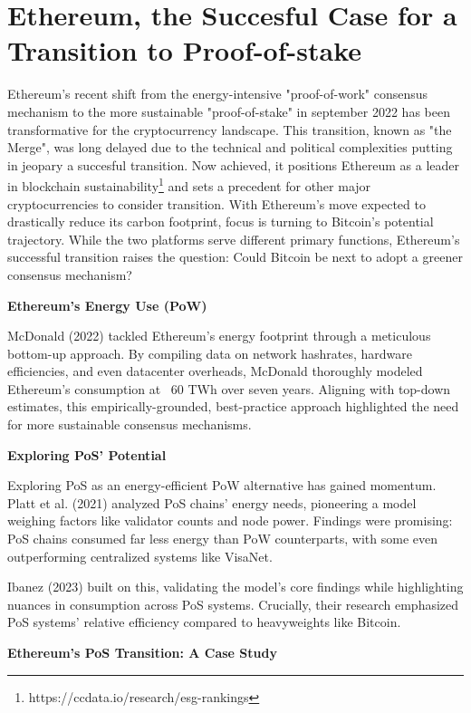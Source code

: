 \documentclass[11pt]{report}
\begin{document}
\section{Ethereum, the Succesful Case for a Transition to Proof-of-stake}

Ethereum's recent shift from the energy-intensive "proof-of-work" consensus mechanism to the more sustainable "proof-of-stake" in september 2022 has been transformative for the cryptocurrency landscape. This transition, known as "the Merge", was long delayed due to the technical and political complexities putting in jeopary a succesful transition. Now achieved, it positions Ethereum as a leader in blockchain sustainability\footnote{https://ccdata.io/research/esg-rankings} and sets a precedent for other major cryptocurrencies to consider transition. With Ethereum's move expected to drastically reduce its carbon footprint, focus is turning to Bitcoin's potential trajectory. While the two platforms serve different primary functions, Ethereum's successful transition raises the question: Could Bitcoin be next to adopt a greener consensus mechanism?

\textbf{Ethereum's Energy Use (PoW)}

McDonald (2022)\cite{mcdonaldEthereumEmissionsBottomup2022} tackled Ethereum's energy footprint through a meticulous bottom-up approach. By compiling data on network hashrates, hardware efficiencies, and even datacenter overheads, McDonald thoroughly modeled Ethereum's consumption at ~60 TWh over seven years. Aligning with top-down estimates, this empirically-grounded, best-practice approach highlighted the need for more sustainable consensus mechanisms.

\textbf{Exploring PoS' Potential}

Exploring PoS as an energy-efficient PoW alternative has gained momentum. Platt et al. (2021)\cite{plattEnergyFootprintBlockchain2021} analyzed PoS chains' energy needs, pioneering a model weighing factors like validator counts and node power. Findings were promising: PoS chains consumed far less energy than PoW counterparts, with some even outperforming centralized systems like VisaNet.

Ibanez (2023) built on this, validating the model's core findings while highlighting nuances in consumption across PoS systems. Crucially, their research emphasized PoS systems' relative efficiency compared to heavyweights like Bitcoin.

\textbf{Ethereum's PoS Transition: A Case Study}
\end{document}
